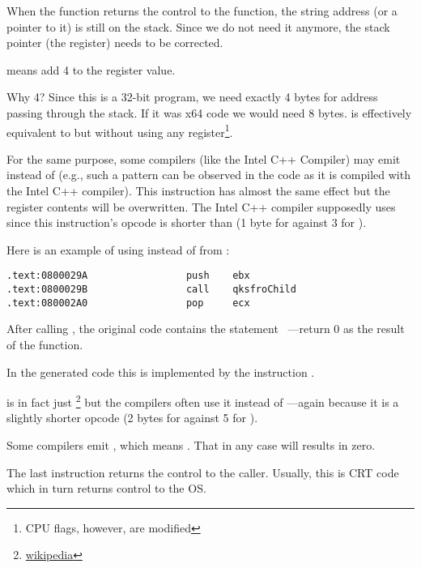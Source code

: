 When the \printf function returns the control to the \main function, the string address (or a pointer to it) is still on the stack.
Since we do not need it anymore, the \gls{stack pointer} (the \ESP register) needs to be corrected.

 means add 4 to the \ESP register value.

Why 4? Since this is a 32-bit program, we need exactly 4 bytes for address passing through the stack. If it was x64 code we would need 8 bytes.
 is effectively equivalent to  but without using any register\footnote{CPU flags, however, are modified}.

\myindex{\oracle}

For the same purpose, some compilers (like the Intel C++ Compiler) may emit 
instead of \ADD (e.g., such a pattern can be observed in the \oracle{} code as it is compiled with the Intel C++ compiler).
This instruction has almost the same effect but the \ECX register contents will be overwritten.
The Intel C++ compiler supposedly uses  since this instruction's opcode is shorter than  (1 byte for  against 3 for ).

Here is an example of using \POP instead of \ADD from \oracle{}:

\begin{lstlisting}[caption=\oracle 10.2 Linux (app.o file),style=customasmx86]
.text:0800029A                 push    ebx
.text:0800029B                 call    qksfroChild
.text:080002A0                 pop     ecx
\end{lstlisting}

After calling \printf, the original \CCpp code contains the statement ~---return 0 as the result of the \main function.

In the generated code this is implemented by the instruction .


\XOR is in fact just \footnote{\href{http://go.yurichev.com/17118}{wikipedia}} but the compilers often use it instead of
---again because it is a slightly shorter opcode (2 bytes for \XOR against 5 for \MOV).

Some compilers emit , which means  \EAX {} \EAX. That in any case will results in zero.

The last instruction \RET returns the control to the \gls{caller}. Usually, this is \CCpp \ac{CRT} code which in turn returns control to the \ac{OS}.

